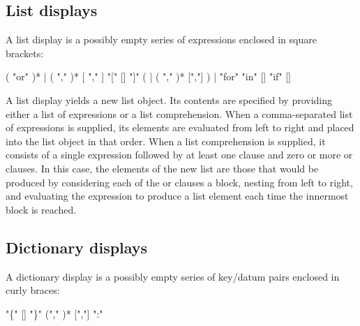 \subsection{List displays\label{lists}}

A list display is a possibly empty series of expressions enclosed in
square brackets:

\begin{productionlist}
             { ( "or"  )*
              | }
             { ( ","  )* [ "," ]}
             {"[" [] "]"}
             { ( 
              | ( ","  )* [","] )}
             { | }
             {"for"  "in" 
              []}
             {"if"  []}
\end{productionlist}

A list display yields a new list object.  Its contents are specified
by providing either a list of expressions or a list comprehension.
When a comma-separated list of expressions is supplied, its elements are
evaluated from left to right and placed into the list object in that
order.  When a list comprehension is supplied, it consists of a
single expression followed by at least one  clause and zero or
more  or  clauses.  In this
case, the elements of the new list are those that would be produced
by considering each of the  or  clauses a block,
nesting from
left to right, and evaluating the expression to produce a list element
each time the innermost block is reached.


\subsection{Dictionary displays\label{dict}}

A dictionary display is a possibly empty series of key/datum pairs
enclosed in curly braces:

\begin{productionlist}
             {"\{" [] "\}"}
             { ("," )* [","]}
             { ":" }
\end{productionlist}

